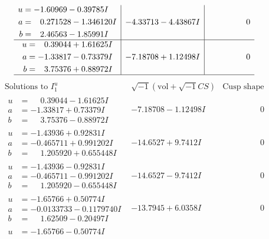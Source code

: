 \documentclass[1p]{elsarticle_modified}
\theoremstyle{definition}
\newcommand{\I}{\sqrt{-1}}
\begin{document}
$$\begin{array}{c|c|c}
\begin{aligned}
u &= -1.60969 - 0.39785 I \\
a &= \phantom{-}0.271528 - 1.346120 I \\
b &= \phantom{-}2.46563 - 1.85991 I\end{aligned}
 & -4.33713 - 4.43867 I & \phantom{-0.000000 } 0 \\ \hline\begin{aligned}
u &= \phantom{-}0.39044 + 1.61625 I \\
a &= -1.33817 - 0.73379 I \\
b &= \phantom{-}3.75376 + 0.88972 I\end{aligned}
 & -7.18708 + 1.12498 I & \phantom{-0.000000 } 0\\
 \hline 
 \end{array}$$\newpage$$\begin{array}{c|c|c}  
\text{Solutions to }I^u_{1}& \I (\text{vol} + \sqrt{-1}CS) & \text{Cusp shape}\\
 \hline 
\begin{aligned}
u &= \phantom{-}0.39044 - 1.61625 I \\
a &= -1.33817 + 0.73379 I \\
b &= \phantom{-}3.75376 - 0.88972 I\end{aligned}
 & -7.18708 - 1.12498 I & \phantom{-0.000000 } 0 \\ \hline\begin{aligned}
u &= -1.43936 + 0.92831 I \\
a &= -0.465711 + 0.991202 I \\
b &= \phantom{-}1.205920 + 0.655448 I\end{aligned}
 & -14.6527 + 9.7412 I & \phantom{-0.000000 } 0 \\ \hline\begin{aligned}
u &= -1.43936 - 0.92831 I \\
a &= -0.465711 - 0.991202 I \\
b &= \phantom{-}1.205920 - 0.655448 I\end{aligned}
 & -14.6527 - 9.7412 I & \phantom{-0.000000 } 0 \\ \hline\begin{aligned}
u &= -1.65766 + 0.50774 I \\
a &= -0.0133733 - 0.1179740 I \\
b &= \phantom{-}1.62509 - 0.20497 I\end{aligned}
 & -13.7945 + 6.0358 I & \phantom{-0.000000 } 0 \\ \hline\begin{aligned}
u &= -1.65766 - 0.50774 I \\

\end{aligned}
\end{array}$$
\end{document}
